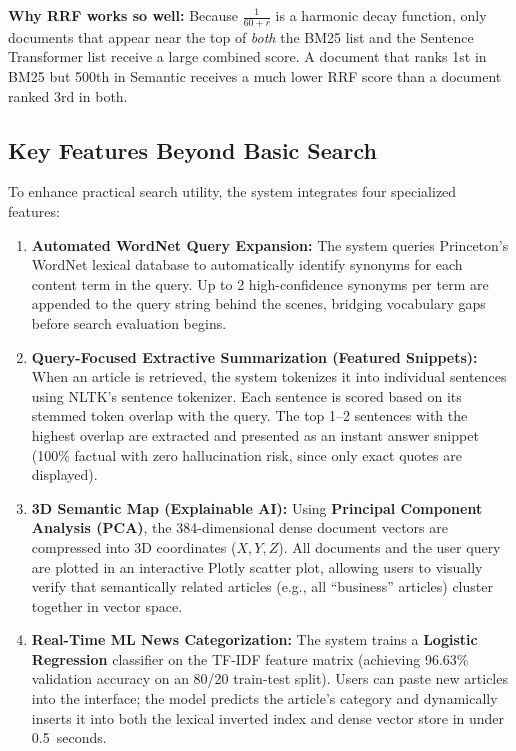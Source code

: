 \documentclass[11pt,a4paper]{article}
\begin{document}
\textbf{Why RRF works so well:} Because $\frac{1}{60 + r}$ is a harmonic decay function, only documents that appear near the top of \textit{both} the BM25 list and the Sentence Transformer list receive a large combined score. A document that ranks 1st in BM25 but 500th in Semantic receives a much lower RRF score than a document ranked 3rd in both.

\subsection{Key Features Beyond Basic Search}
To enhance practical search utility, the system integrates four specialized features:
\begin{enumerate}[label=\textbf{\arabic*.}]
    \item \textbf{Automated WordNet Query Expansion:} The system queries Princeton's WordNet lexical database to automatically identify synonyms for each content term in the query. Up to 2 high-confidence synonyms per term are appended to the query string behind the scenes, bridging vocabulary gaps before search evaluation begins.
    \item \textbf{Query-Focused Extractive Summarization (Featured Snippets):} When an article is retrieved, the system tokenizes it into individual sentences using NLTK's sentence tokenizer. Each sentence is scored based on its stemmed token overlap with the query. The top 1--2 sentences with the highest overlap are extracted and presented as an instant answer snippet (100\% factual with zero hallucination risk, since only exact quotes are displayed).
    \item \textbf{3D Semantic Map (Explainable AI):} Using \textbf{Principal Component Analysis (PCA)}, the 384-dimensional dense document vectors are compressed into 3D coordinates ($X, Y, Z$). All documents and the user query are plotted in an interactive Plotly scatter plot, allowing users to visually verify that semantically related articles (e.g., all ``business'' articles) cluster together in vector space.
    \item \textbf{Real-Time ML News Categorization:} The system trains a \textbf{Logistic Regression} classifier on the TF-IDF feature matrix (achieving 96.63\% validation accuracy on an 80/20 train-test split). Users can paste new articles into the interface; the model predicts the article's category and dynamically inserts it into both the lexical inverted index and dense vector store in under 0.5~seconds.
\end{enumerate}
\end{document}
